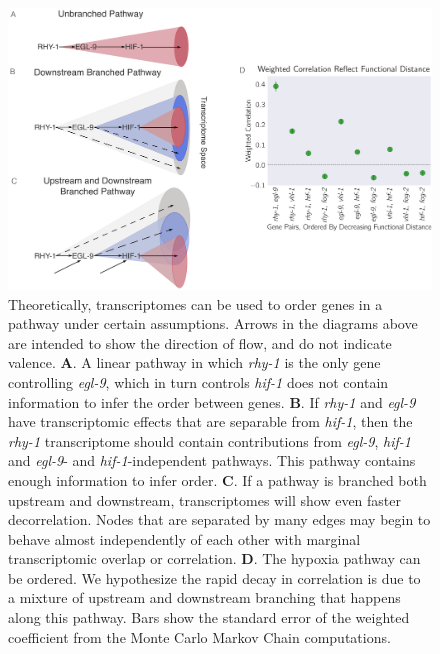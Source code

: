 \documentclass[10pt, onecolumn]{article}
\newcommand{\gene}[1]{\emph{#1}}
\begin{document}
\begin{figure}[tbhp]
\centering
\includegraphics[width=.8\linewidth]{../figs/decorrelation-horizontal.pdf}
\caption{
Theoretically, transcriptomes can be used to order genes in a pathway under
certain assumptions. Arrows in the diagrams above are intended to show the
direction of flow, and do not indicate valence.
\textbf{A}. A linear pathway in which \gene{rhy-1} is the only gene controlling
\gene{egl-9}, which in turn controls \gene{hif-1} does not contain information
to infer the order between genes.
\textbf{B}. If \gene{rhy-1} and \gene{egl-9} have transcriptomic effects that are
separable from \gene{hif-1}, then the \gene{rhy-1} transcriptome should contain
contributions from \gene{egl-9}, \gene{hif-1} and \gene{egl-9}- and
\gene{hif-1}-independent pathways. This pathway contains enough information to
infer order.
\textbf{C}. If a pathway is branched both upstream and downstream,
transcriptomes will show even faster decorrelation. Nodes that are
separated by many edges may begin to behave almost independently of each other
with marginal transcriptomic overlap or correlation.
\textbf{D}. The hypoxia pathway can be ordered.
We hypothesize the rapid decay in correlation is due to a mixture of
upstream and downstream branching that happens along this pathway. Bars show the
standard error of the weighted coefficient from the Monte Carlo Markov Chain
computations.
}
\label{fig:decorrelation}
\end{figure}
\end{document}

